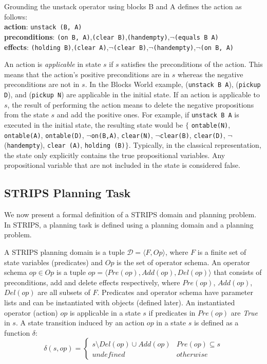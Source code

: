 \noindent Grounding the unstack operator using blocks B and A defines the action as follows:\\
\textbf{action}: \texttt{unstack (B, A)}\\[-0.5em]
\textbf{preconditions}: \texttt{(on B, A)},\texttt{(clear B)},\texttt{(handempty)},$\neg$\texttt{(equals B A)}\\[-0.5em]
\textbf{effects}: \texttt{(holding B)},\texttt{(clear A)},$\neg$\texttt{(clear B)},$\neg$\texttt{(handempty)},$\neg$\texttt{(on B, A)}

\noindent An action is \textit{applicable} in state $s$ if $s$ satisfies the preconditions of the action. 
This means that the action's positive preconditions are  in $s$ whereas the negative preconditions are not in $s$. 
In the Blocks World example, (\texttt{unstack B A}), (\texttt{pickup D}), and (\texttt{pickup N}) are applicable in the initial state. If an action is applicable to $s$, the result of performing the action means to delete the negative propositions from the state $s$ and add the positive ones. For example, if \texttt{unstack B A} is executed in the initial state, the resulting state would be $\lbrace$ \texttt{ontable(N)}, \texttt{ontable(A)}, \texttt{ontable(D)}, $\neg$\texttt{on(B,A)}, \texttt{clear(N)}, $\neg$\texttt{clear(B)}, \texttt{clear(D)}, $\neg$(\texttt{handempty}), \texttt{clear (A)}, \texttt{holding (B)}$\rbrace$. Typically, in the classical representation, the state only explicitly contains the true propositional variables. Any propositional variable that are not included in the state is considered false.


\subsection{STRIPS Planning Task}
We now present a formal definition of a STRIPS domain and planning problem. In STRIPS, a planning task is defined using a planning domain and a planning problem.
\begin{definition}
A STRIPS planning domain is a tuple $\mathcal{D}=\langle F, Op\rangle$, where $F$ is a finite set of  state variables (predicates) and $Op$ is the set of operator schema. An operator schema $op \in Op$ is a tuple $ op = \langle Pre(op), Add(op), Del(op)\rangle$ that consists of preconditions, add and delete effects respectively, where $Pre(op)$, $Add(op)$, $Del(op)$ are all subsets of $F$. Predicates and operator schema have parameter lists and can be instantiated with objects (defined later). An instantiated operator (action) $op$ is applicable in a state $s$ if predicates in $Pre(op)$ are \textit{True} in $s$. A state transition induced by an action $op$ in a state $s$ is defined as a function $\delta$:
\begin{equation*}
\delta (s,op) = \left\{\begin{matrix}
s\setminus Del(op) \cup Add(op) & Pre(op) \subseteq s\\ 
undefined & otherwise
\end{matrix}\right.
\end{equation*}
\end{definition}

